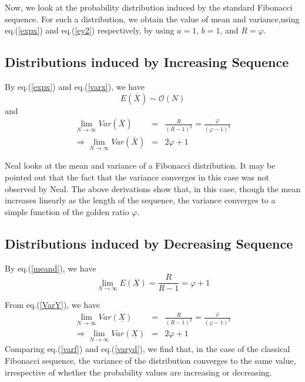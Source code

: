 \begin{multicols}{2}
Now, we look at the probability distribution induced by the standard Fibonacci sequence. For such a distribution, we obtain the value of mean and variance,using eq.(\ref{expx}) and eq.(\ref{ey2}) respectively, by using $a = 1 $, $b = 1$, and $R = \varphi$.

\subsection{Distributions induced by Increasing Sequence}\label{subsection-8.1}

By eq.(\ref{expx}) and eq.(\ref{varx}), we have 
$$
\nonumber E(\bar{X})  \sim \mathcal{O}(N)
$$
and 
\begin{eqnarray}
\lim_{N \rightarrow \infty}Var(\bar{X}) &=& \frac{R}{(R-1)^2} = \frac{\varphi}{(\varphi-1)^2}\nonumber\\
\Rightarrow \lim_{N \rightarrow \infty}Var(\bar{X}) &=& 2\varphi+1\label{eq-8.1}
\end{eqnarray}

Neal \cite{art2-key01} looks at the mean and variance of a Fibonacci distribution. It may be pointed out that the fact that the variance converges in this case was not observed by Neal. The above derivations show that, in this case, though the mean increases linearly as the length of the sequence, the variance converges to a simple function of the golden ratio $\varphi$.

\subsection{Distributions induced by Decreasing Sequence}\label{subsection-8.2}
By eq.(\ref{meand}), we have
\begin{equation}
\nonumber \displaystyle{\lim_{N \rightarrow \infty}}E(\underline{X}) =  \displaystyle{\frac{R}{R-1}} = \varphi + 1
 \end{equation}

From eq.(\ref{VarY}), we have
\begin{eqnarray}
\displaystyle{\lim_{N \rightarrow \infty}}Var(\underline{X}) &=& \frac{R}{(R-1)^2} =\frac{\varphi}{(\varphi-1)^2} \nonumber \\
\Rightarrow \displaystyle{\lim_{N \rightarrow \infty}}Var(\underline{X}) &=& 2\varphi + 1\label{eq-8.2}
\end{eqnarray}
Comparing eq.(\ref{varf}) and eq.(\ref{varyd}), we find that, in the case of the classical Fibonacci sequence, the variance of the distribution converges to the same value, irrespective of whether the probability values are increasing or decreasing.


\end{multicols}
